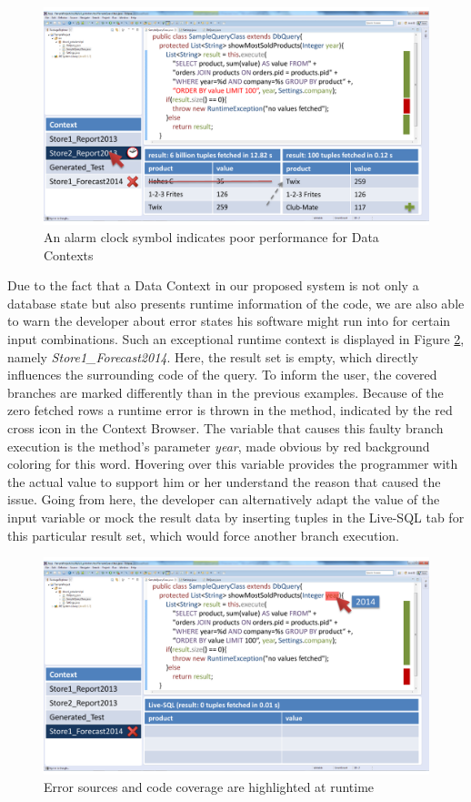 \begin{figure}
\begin{centering}
    \includegraphics[width=1.0\linewidth]{images/slow}
    \caption{An alarm clock symbol indicates poor performance for Data Contexts}
    \label{fig:final_prototype_slow}
\end{centering}
\end{figure}
Due to the fact that a Data Context in our proposed system is not only a database state but also presents runtime information of the code, we are also able to warn the developer about error states his software might run into for certain input combinations. Such an exceptional runtime context is displayed in Figure \ref{fig:final_prototype_error}, namely \emph{Store1\_Forecast2014}. Here, the result set is empty, which directly influences the surrounding code of the query. To inform the user, the covered branches are marked differently than in the previous examples. Because of the zero fetched rows a runtime error is thrown in the method, indicated by the red cross icon in the Context Browser. The variable that causes this faulty branch execution is the method's parameter \emph{year}, made obvious by red background coloring for this word. Hovering over this variable provides the programmer with the actual value to support him or her understand the reason that caused the issue. Going from here, the developer can alternatively adapt the value of the input variable or mock the result data by inserting tuples in the Live-SQL tab for this particular result set, which would force another branch execution.\\
\begin{figure}
\begin{centering}
    \includegraphics[width=1.0\linewidth]{images/error}
    \caption{Error sources and code coverage are highlighted at runtime}
    \label{fig:final_prototype_error}
\end{centering}
\end{figure}